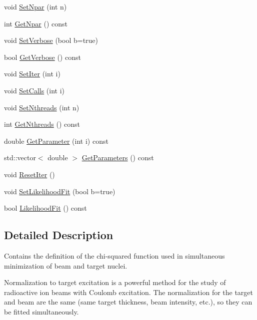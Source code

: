 \begin{DoxyCompactItemize}
\item 
void \hyperlink{classCoulExSimMinFCN_aee050c5a88acb9f507365a7143c07253}{Set\-Npar} (int n)
\item 
int \hyperlink{classCoulExSimMinFCN_a9bcb5e4c7fe91e790a8fbd0e976519b3}{Get\-Npar} () const 
\item 
void \hyperlink{classCoulExSimMinFCN_a19ceaaa3e8f72055d977d9e72ea5f2bd}{Set\-Verbose} (bool b=true)
\item 
bool \hyperlink{classCoulExSimMinFCN_a6c49273f2ca24b024044ce0ca6bf3349}{Get\-Verbose} () const 
\item 
void \hyperlink{classCoulExSimMinFCN_a0d1239e0f051c6b5e20ce96437c1bcf4}{Set\-Iter} (int i)
\item 
void \hyperlink{classCoulExSimMinFCN_a39ea44fd91f63d14dfd5b07c0d5b20c5}{Set\-Calls} (int i)
\item 
void \hyperlink{classCoulExSimMinFCN_ac6b51a3a54c1a5a63d66b91caaf44f55}{Set\-Nthreads} (int n)
\item 
int \hyperlink{classCoulExSimMinFCN_a0b8f9607e5a13d8043dc4cedd64d7a3b}{Get\-Nthreads} () const 
\item 
double \hyperlink{classCoulExSimMinFCN_a098d6b22ceafe1fcfcdf5a7fc30fc587}{Get\-Parameter} (int i) const 
\item 
std\-::vector$<$ double $>$ \hyperlink{classCoulExSimMinFCN_a227288249c2a8e954c6073a38f273a19}{Get\-Parameters} () const 
\item 
void \hyperlink{classCoulExSimMinFCN_a08bce4be13075badac14049126520685}{Reset\-Iter} ()
\item 
void \hyperlink{classCoulExSimMinFCN_a1a5808264585b6aa477b700317aa2028}{Set\-Likelihood\-Fit} (bool b=true)
\item 
bool \hyperlink{classCoulExSimMinFCN_a8d3ebe3f7ef92d360a6708a2e2275a7e}{Likelihood\-Fit} () const 
\end{DoxyCompactItemize}


\subsection{Detailed Description}
Contains the definition of the chi-\/squared function used in simultaneous minimization of beam and target nuclei. 

Normalization to target excitation is a powerful method for the study of radioactive ion beams with Coulomb excitation. The normalization for the target and beam are the same (same target thickness, beam intensity, etc.), so they can be fitted simultaneously.

